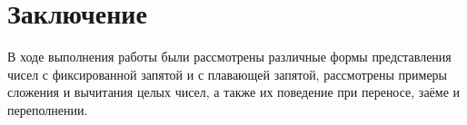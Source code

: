 \section*{Заключение}

В ходе выполнения работы были рассмотрены различные формы представления чисел
с фиксированной запятой и с плавающей запятой, рассмотрены примеры сложения
и вычитания целых чисел, а также их поведение при переносе, заёме и переполнении.

